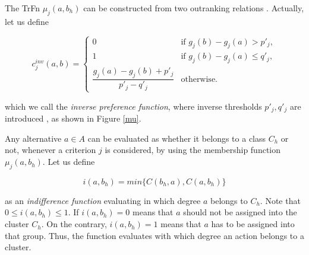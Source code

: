 \documentclass[]{elsarticle}
\theoremstyle{definition}
\begin{document}
The TrFn $\mu_j(a,b_h)$ can be constructed from two outranking relations \citep{perny1992}. Actually,  let us define  

\begin{equation}
c^{inv}_j(a,b) =
\begin{cases}
	0							& \mbox{if  $g_j(b)-g_j(a) > p'_j$}, \\
	1							& \mbox{if  $g_j(b)-g_j(a) \leq q'_j$},   \\
	\dfrac{g_j(a)-g_j(b)+p'_j}{p'_j-q'_j} 	& \mbox{otherwise}. 				     	      
 \end{cases} 
 \label{invcredibility}
 \end{equation} 

\noindent
which we call the \emph{inverse preference function}, where inverse thresholds $p'_j,q'_j$ are introduced \citep{roy2012}, as shown in Figure \ref{mu}.  

Any alternative $a \in A$ can be evaluated as whether it belongs to a class $C_h$ or not, whenever a criterion $j$ is considered, by using the membership function $\mu_j(a,b_h)$.   Let us define 

\begin{equation}
i(a,b_h)=min\{C(b_h,a),C(a,b_h)\} \label{indifference}
\end{equation}
 
\noindent 
as an \emph{indifference function} evaluating in which degree $a$ belongs to $C_h$.  Note that $0\leq i(a,b_h)\leq 1$. If $i(a,b_h)=0$ means that $a$  should not be assigned  into the cluster $C_h$. On the contrary, $i(a,b_h)=1$ means that $a$ has to be assigned into that group. Thus, the function evaluates with which degree an action belongs to a cluster.
\end{document}
